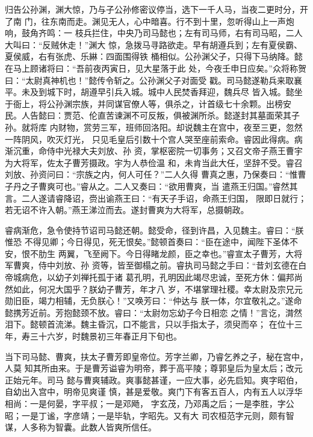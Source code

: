 归告公孙渊，渊大惊，乃与子公孙修密议停当，选下一千人马，当夜二更时分，开了南
门，往东南而走。渊见无人，心中暗喜。行不到十里，忽听得山上一声炮响，鼓角齐鸣：一
枝兵拦住，中央乃司马懿也；左有司马师，右有司马昭，二人大叫曰：“反贼休走！”渊大
惊，急拨马寻路欲走。早有胡遵兵到；左有夏侯霸、夏侯威，右有张虎、乐綝：四面围得铁
桶相似。公孙渊父子，只得下马纳降。懿在马上顾诸将曰：“吾前夜丙寅日，见大星落于此
处，今夜壬申日应矣。”众将称贺曰：“太尉真神机也！”懿传令斩之。公孙渊父子对面受
戳。司马懿遂勒兵来取襄平。未及到城下时，胡遵早引兵入城。城中人民焚香拜迎，魏兵尽
皆入城。懿坐于衙上，将公孙渊宗族，并同谋官僚人等，俱杀之，计首级七十余颗。出榜安
民。人告懿曰：贾范、伦直苦谏渊不可反叛，俱被渊所杀。懿遂封其墓面荣其子孙。就将库
内财物，赏劳三军，班师回洛阳。却说魏主在宫中，夜至三更，忽然一阵阴风，吹灭灯光，
只见毛皇后引数十个宫人哭至座前索命。睿因此得病。病渐沉重，命侍中光禄大夫刘放、孙
资，掌枢密院一切事务；又召文帝子燕王曹宇为大将军，佐太子曹芳摄政。宇为人恭俭温
和，未肯当此大任，坚辞不受。睿召刘放、孙资问曰：“宗族之内，何人可任？”二人久得
曹真之惠，乃保奏曰：“惟曹子丹之子曹爽可也。”睿从之。二人又奏曰：“欲用曹爽，当
遣燕王归国。”睿然其言。二人遂请睿降诏，赍出谕燕王曰：“有天子手诏，命燕王归国，
限即日就行；若无诏不许入朝。”燕王涕泣而去。遂封曹爽为大将军，总摄朝政。

睿病渐危，急令使持节诏司马懿还朝。懿受命，径到许昌，入见魏主。睿曰：“朕惟恐
不得见卿；今日得见，死无恨矣。”懿顿首奏曰：“臣在途中，闻陛下圣体不安，恨不肋生
两翼，飞至阙下。今日得睹龙颜，臣之幸也。”睿宣太子曹芳，大将军曹爽，侍中刘放、孙
资等，皆至御榻之前。睿执司马懿之手曰：“昔刘玄德在白帝城病危，以幼子刘禅托孤于诸
葛孔明，孔明因此竭尽忠诚，至死方休：偏邦尚然如此，何况大国乎？朕幼子曹芳，年才八
岁，不堪掌理社稷。幸太尉及宗兄元勋旧臣，竭力相辅，无负朕心！”又唤芳曰：“仲达与
朕一体，尔宜敬礼之。”遂命懿携芳近前。芳抱懿颈不放。睿曰：“太尉勿忘幼子今日相恋
之情！”言讫，潸然泪下。懿顿首流涕。魏主昏沉，口不能言，只以手指太子，须臾而卒；
在位十三年，寿三十六岁，时魏景初三年春正月下旬也。

当下司马懿、曹爽，扶太子曹芳即皇帝位。芳字兰卿，乃睿乞养之子，秘在宫中，人莫
知其所由来。于是曹芳谥睿为明帝，葬于高平陵；尊郭皇后为皇太后；改元正始元年。司马
懿与曹爽辅政。爽事懿甚谨，一应大事，必先启知。爽字昭伯，自幼出入宫中，明帝见爽谨
慎，甚是爱敬。爽门下有客五百人，内有五人以浮华相尚：一是何晏，字平叔；一是邓飏，
字玄茂，乃邓禹之后；一是李胜，字公昭；一是丁谧，字彦靖；一是毕轨，字昭先。又有大
司农桓范字元则，颇有智谋，人多称为智囊。此数人皆爽所信任。

